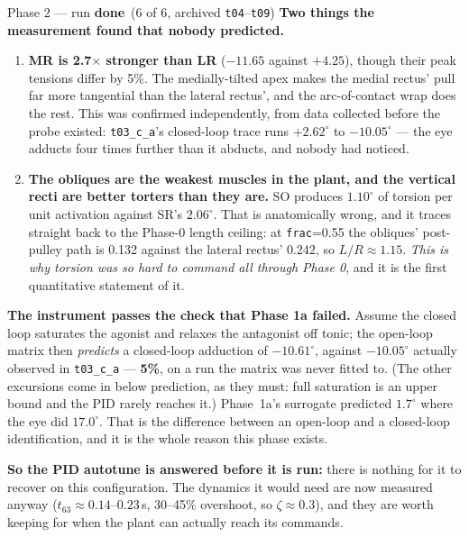 \documentclass[11pt,a4paper]{article}
\newcommand{\code}[1]{\texttt{#1}}
\newcommand{\dn}{\textcolor{good}{\textbf{done}}}
\begin{document}
\begin{runbox}{Phase 2 --- run \hfill \dn\ (6 of 6, archived \code{t04}--\code{t09})}
\textbf{Two things the measurement found that nobody predicted.}

\begin{enumerate}
\item \textbf{MR is 2.7$\times$ stronger than LR} ($-11.65$ against $+4.25$), though their peak
tensions differ by 5\%. The medially-tilted apex makes the medial rectus' pull far more tangential
than the lateral rectus', and the arc-of-contact wrap does the rest. This was confirmed
independently, from data collected before the probe existed: \code{t03\_c\_a}'s closed-loop trace
runs $+2.62^\circ$ to $-10.05^\circ$ --- the eye adducts four times further than it abducts, and
nobody had noticed.
\item \textbf{The obliques are the weakest muscles in the plant, and the vertical recti are better
torters than they are.} SO produces $1.10^\circ$ of torsion per unit activation against SR's
$2.06^\circ$. That is anatomically wrong, and it traces straight back to the Phase-0 length
ceiling: at \code{frac}=0.55 the obliques' post-pulley path is 0.132 against the lateral rectus'
0.242, so $L/R\approx1.15$. \emph{This is why torsion was so hard to command all through Phase 0},
and it is the first quantitative statement of it.
\end{enumerate}

\begin{tcolorbox}[colback=good!5,colframe=good!45,boxrule=0.7pt,arc=2pt]
\textbf{The instrument passes the check that Phase 1a failed.} Assume the closed loop saturates the
agonist and relaxes the antagonist off tonic; the open-loop matrix then \emph{predicts} a
closed-loop adduction of $-10.61^\circ$, against $-10.05^\circ$ actually observed in
\code{t03\_c\_a} --- \textbf{5\%}, on a run the matrix was never fitted to. (The other excursions
come in below prediction, as they must: full saturation is an upper bound and the PID rarely
reaches it.) Phase~1a's surrogate predicted $1.7^\circ$ where the eye did $17.0^\circ$. That is the
difference between an open-loop and a closed-loop identification, and it is the whole reason this
phase exists.
\end{tcolorbox}

\textbf{So the PID autotune is answered before it is run:} there is nothing for it to recover on
this configuration. The dynamics it would need are now measured anyway ($t_{63}\approx0.14$--$0.23$\,s,
30--45\% overshoot, so $\zeta\approx0.3$), and they are worth keeping for when the plant can
actually reach its commands.
\end{runbox}
\end{document}
